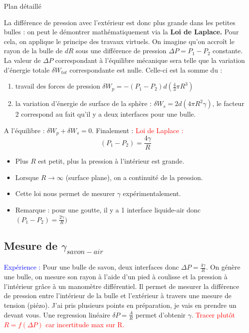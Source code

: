 \begin{reportBlock}{Plan détaillé}
\begin{center}
 \end{center}
 La différence de pression avec l'extérieur est donc plus grande dans les petites bulles : on peut le démontrer mathématiquement via la \textbf{Loi de Laplace.}
 Pour cela, on applique le principe des travaux virtuels. On imagine qu'on accroît le rayon de la bulle de $dR$ sous une différence de pression $\Delta P = P_1-P_2$ constante. La valeur de $\Delta P$ correspondant à l'équilibre mécanique sera telle que la variation d'énergie totale $\delta W_{tot}$ correspondante est nulle. Celle-ci est la somme du :
 \begin{enumerate}
     \item travail des forces de pression $\delta W_p = -(P_1-P_2)d(\frac{4}{3}\pi R^3)$
     \item la variation d'énergie de surface de la sphère : $\delta W_s = 2d(4\pi R^2\gamma)$, le facteur 2 correspond au fait qu'il y a deux interfaces pour une bulle.
 \end{enumerate}
 A l'équilibre : $\delta W_p+\delta W_s =0$.  Finalement : 
 \textcolor{red}{Loi de Laplace : }
 \begin{equation}
     (P_1-P_2)=\frac{4\gamma}{R}
 \end{equation}
 \begin{itemize}
     \item Plus $R$ est petit, plus la pression à l'intérieur est grande. 
     \item Lorsque $R \rightarrow \infty$ (surface plane), on a continuité de la pression.
     \item Cette loi nous permet de mesurer $\gamma$ expérimentalement.
     \item Remarque : pour une goutte, il y a 1 interface liquide-air donc $(P_1-P_2)=\frac{2\gamma}{R})$
 \end{itemize}
 
 \subsection{Mesure de $\gamma_{savon-air}$}
 \textcolor{blue}{Expérience :}  Pour une bulle de savon, deux interfaces donc $\Delta P =\frac{4\gamma}{R}$. On génère une bulle, on mesure son rayon à l'aide d'un pied à coulisse et la pression à l'intérieur grâce à un manomètre différentiel. Il permet de mesurer la différence de pression entre l'intérieur de la bulle et l'extérieur à travers une mesure de tension (piézo). J'ai pris plusieurs points en préparation, je vais en prendre un devant vous. Une regression linéaire $\delta P = \frac{A}{R}$ permet d'obtenir $\gamma$. \textcolor{red}{Tracer plutôt $R=f(\Delta P)$ car incertitude max sur R.}\\


\end{reportBlock}
